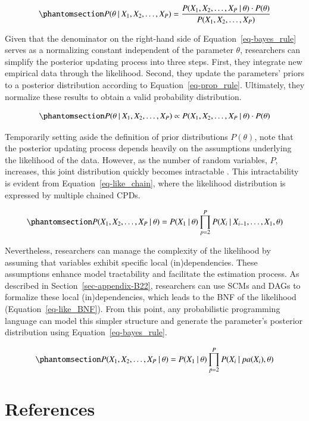 \documentclass[
  authoryear,
  review,
  1p]{elsarticle}
\begin{document}
\begin{equation}\phantomsection\label{eq-bayes_rule}{
P(\theta \:|\:X_{1}, X_{2}, \dots, X_{P}) = \frac{P(X_{1}, X_{2}, \dots, X_{P} \:|\:\theta) \cdot P(\theta)}{P(X_{1}, X_{2}, \dots, X_{P})}
}\end{equation}

Given that the denominator on the right-hand side of
Equation~\ref{eq-bayes_rule} serves as a normalizing constant
independent of the parameter \(\theta\), researchers can simplify the
posterior updating process into three steps. First, they integrate new
empirical data through the likelihood. Second, they update the
parameters' priors to a posterior distribution according to
Equation~\ref{eq-prop_rule}. Ultimately, they normalize these results to
obtain a valid probability distribution.

\begin{equation}\phantomsection\label{eq-prop_rule}{
P(\theta \:|\:X_{1}, X_{2}, \dots, X_{P}) \propto P(X_{1}, X_{2}, \dots, X_{P}\:|\:\theta) \cdot P(\theta)
}\end{equation}

Temporarily setting aside the definition of prior distributions
\(P(\theta)\), note that the posterior updating process depends heavily
on the assumptions underlying the likelihood of the data. However, as
the number of random variables, \(P\), increases, this joint
distribution quickly becomes intractable \citep{Neal_2020}. This
intractability is evident from Equation~\ref{eq-like_chain}, where the
likelihood distribution is expressed by multiple chained CPDs.

\begin{equation}\phantomsection\label{eq-like_chain}{
P(X_{1}, X_{2}, \dots, X_{P} \:|\:\theta) = P(X_{1} \:|\:\theta) \prod^{P}_{p=2} P(X_{i} \:|\:X_{i-1}, \dots, X_{1}, \theta )
}\end{equation}

Nevertheless, researchers can manage the complexity of the likelihood by
assuming that variables exhibit specific local (in)dependencies. These
assumptions enhance model tractability and facilitate the estimation
process. As described in Section~\ref{sec-appendix-B22}, researchers can
use SCMs and DAGs to formalize these local (in)dependencies, which leads
to the BNF of the likelihood (Equation~\ref{eq-like_BNF}). From this
point, any probabilistic programming language can model this simpler
structure and generate the parameter's posterior distribution using
Equation~\ref{eq-bayes_rule}.

\begin{equation}\phantomsection\label{eq-like_BNF}{
P(X_{1}, X_{2}, \dots, X_{P} \:|\:\theta) = P(X_{1} \:|\:\theta) \prod^{P}_{p=2} P(X_{i} \:|\:pa(X_{i}), \theta )
}\end{equation}

\newpage{}

\section*{References}\label{references}

\renewcommand{\bibsection}{}

\end{document}
